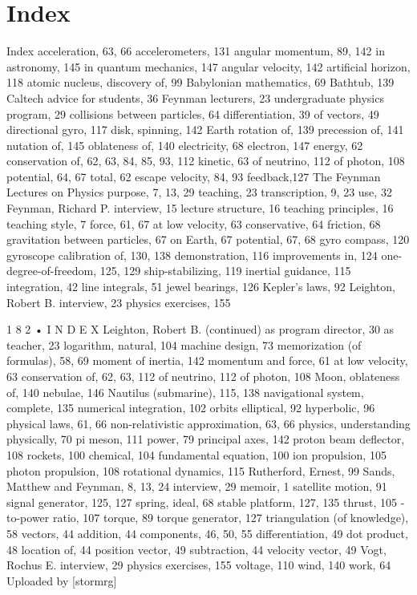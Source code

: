 \documentclass[10pt,oneside]{article}
\begin{document}
\section*{Index}
\label{tips-sec-15-index}
Index acceleration, 63, 66 accelerometers, 131 angular momentum, 89, 142 in astronomy, 145 in quantum mechanics, 147 angular velocity, 142 artificial horizon, 118 atomic nucleus, discovery of, 99 Babylonian mathematics, 69 Bathtub, 139 Caltech advice for students, 36 Feynman lecturers, 23 undergraduate physics program, 29 collisions between particles, 64 differentiation, 39 of vectors, 49 directional gyro, 117 disk, spinning, 142 Earth rotation of, 139 precession of, 141 nutation of, 145 oblateness of, 140 electricity, 68 electron, 147 energy, 62 conservation of, 62, 63, 84, 85, 93, 112 kinetic, 63 of neutrino, 112 of photon, 108 potential, 64, 67 total, 62 escape velocity, 84, 93 feedback,127 The Feynman Lectures on Physics purpose, 7, 13, 29 teaching, 23 transcription, 9, 23 use, 32 Feynman, Richard P. interview, 15 lecture structure, 16 teaching principles, 16 teaching style, 7 force, 61, 67 at low velocity, 63 conservative, 64 friction, 68 gravitation between particles, 67 on Earth, 67 potential, 67, 68 gyro compass, 120 gyroscope calibration of, 130, 138 demonstration, 116 improvements in, 124 one-degree-of-freedom, 125, 129 ship-stabilizing, 119 inertial guidance, 115 integration, 42 line integrals, 51 jewel bearings, 126 Kepler’s laws, 92 Leighton, Robert B. interview, 23 physics exercises, 155\par

1 8 2 • I N D E X Leighton, Robert B. (continued) as program director, 30 as teacher, 23 logarithm, natural, 104 machine design, 73 memorization (of formulas), 58, 69 moment of inertia, 142 momentum and force, 61 at low velocity, 63 conservation of, 62, 63, 112 of neutrino, 112 of photon, 108 Moon, oblateness of, 140 nebulae, 146 Nautilus (submarine), 115, 138 navigational system, complete, 135 numerical integration, 102 orbits elliptical, 92 hyperbolic, 96 physical laws, 61, 66 non-relativistic approximation, 63, 66 physics, understanding physically, 70 pi meson, 111 power, 79 principal axes, 142 proton beam deflector, 108 rockets, 100 chemical, 104 fundamental equation, 100 ion propulsion, 105 photon propulsion, 108 rotational dynamics, 115 Rutherford, Ernest, 99 Sands, Matthew and Feynman, 8, 13, 24 interview, 29 memoir, 1 satellite motion, 91 signal generator, 125, 127 spring, ideal, 68 stable platform, 127, 135 thrust, 105 -to-power ratio, 107 torque, 89 torque generator, 127 triangulation (of knowledge), 58 vectors, 44 addition, 44 components, 46, 50, 55 differentiation, 49 dot product, 48 location of, 44 position vector, 49 subtraction, 44 velocity vector, 49 Vogt, Rochus E. interview, 29 physics exercises, 155 voltage, 110 wind, 140 work, 64 Uploaded by [stormrg]\par
\end{document}
